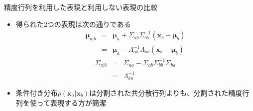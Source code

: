 \begin{frame}{精度行列を利用した表現と利用しない表現の比較}
 \begin{itemize}
  \item 得られた2つの表現は次の通りである
        \begin{eqnarray*}
         \bm{\mu}_{a|b} &=& \bm{\mu}_a + \Sigma_{ab}\Sigma_{bb}^{-1}(\bm{x}_b-\bm{\mu}_b)\\
         &=& \bm{\mu}_a-\Lambda_{aa}^{-1}\Lambda_{ab}(\bm{x}_b-\bm{\mu}_b)
        \end{eqnarray*}
        \begin{eqnarray*}
         \Sigma_{a|b} &=& \Sigma_{aa} - \Sigma_{ab}\Sigma_{bb}^{-1}\Sigma_{ba} \\
         & =& \Lambda_{aa}^{-1}
        \end{eqnarray*}
  \item 条件付き分布$p(\bm{x}_a|\bm{x}_b)$は分割された共分散行列よりも、分割された精度行列を使って表現する方が簡潔
 \end{itemize}
\end{frame}
